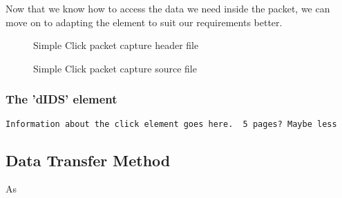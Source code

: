             Now that we know how to access the data we need inside the packet, we can move on to adapting the element to suit our requirements better.

            \begin{figure}[H]
              \centering
              
              \caption{Simple Click packet capture header file}
              \label{fig:click-simple-header}
              
              \caption{Simple Click packet capture source file}
              \label{fig:click-simple-source}
            \end{figure}

        \subsubsection{The 'dIDS' element}
	\texttt{Information about the click element goes here. ~5 pages? Maybe less}
    
    \subsection{Data Transfer Method}
      As 

